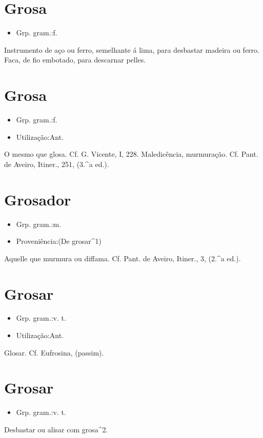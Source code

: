 \section{Grosa}
\begin{itemize}
\item {Grp. gram.:f.}
\end{itemize}
Instrumento de aço ou ferro, semelhante á lima, para desbastar madeira ou ferro.
Faca, de fio embotado, para descarnar pelles.
\section{Grosa}
\begin{itemize}
\item {Grp. gram.:f.}
\end{itemize}
\begin{itemize}
\item {Utilização:Ant.}
\end{itemize}
O mesmo que \textunderscore glosa\textunderscore . Cf. G. Vicente, I, 228.
Maledicência, murmuração. Cf. Pant. de Aveiro, \textunderscore Itiner.\textunderscore , 251, (3.^a ed.).
\section{Grosador}
\begin{itemize}
\item {Grp. gram.:m.}
\end{itemize}
\begin{itemize}
\item {Proveniência:(De \textunderscore grosar\textunderscore ^1)}
\end{itemize}
Aquelle que murmura ou diffama. Cf. Pant. de Aveiro, \textunderscore Itiner.\textunderscore , 3, (2.^a ed.).
\section{Grosar}
\begin{itemize}
\item {Grp. gram.:v. t.}
\end{itemize}
\begin{itemize}
\item {Utilização:Ant.}
\end{itemize}
Glosar. Cf. \textunderscore Eufrosina\textunderscore , (passim).
\section{Grosar}
\begin{itemize}
\item {Grp. gram.:v. t.}
\end{itemize}
Desbastar ou alisar com grosa^2.
